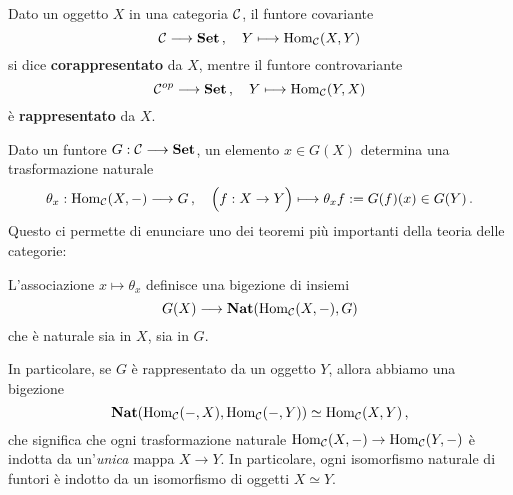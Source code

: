 



\begin{df}
	Dato un oggetto $X$ in una categoria $\mathcal{C}$, il funtore covariante
	\begin{equation*}
		\mathcal{C} \longrightarrow {\normalfont\textbf{Set}}\,, \quad Y \longmapsto \operatorname{Hom}_{\mathcal{C}}(X,Y)
	\end{equation*}
	si dice \textbf{corappresentato} da $X$, mentre il funtore controvariante
	\begin{equation*}
		\mathcal{C}^{op} \longrightarrow {\normalfont\textbf{Set}}\,, \quad Y \longmapsto \operatorname{Hom}_{\mathcal{C}}(Y,X)
	\end{equation*}
	è \textbf{rappresentato} da $X$.
\end{df}



Dato un funtore $G:\mathcal{C} \longrightarrow {\normalfont\textbf{Set}}$,
un elemento $x \in G(X)$ determina una trasformazione naturale
\begin{equation*}
	\theta_{x}: \operatorname{Hom}_{\mathcal{C}}(X,-) \longrightarrow G\,,
	\quad \Big(f:X \to Y \Big) \longmapsto \theta_{x}f := G(f)(x) \in G(Y)\,.
\end{equation*}
Questo ci permette di enunciare uno dei teoremi più importanti
della teoria delle categorie:
\begin{thm}\label{yoneda-lemma}
	L'associazione $x \mapsto \theta_{x}$ definisce una bigezione di insiemi
	\begin{equation*}
		G(X) \longrightarrow {\normalfont\textbf{Nat}}(\operatorname{Hom}_{\mathcal{C}}(X,-),G)
	\end{equation*}
	che è naturale sia in $X$, sia in $G$.
\end{thm}


In particolare, se $G$ è rappresentato da un oggetto $Y$,
allora abbiamo una bigezione
\begin{equation*}
	{\normalfont\textbf{Nat}}(\operatorname{Hom}_{\mathcal{C}}(-,X), \operatorname{Hom}_{\mathcal{C}}(-,Y)) \simeq \operatorname{Hom}_{\mathcal{C}}(X,Y)\,,
\end{equation*}
che significa che ogni trasformazione naturale $\operatorname{Hom}_{\mathcal{C}}(X,-) \to \operatorname{Hom}_{\mathcal{C}}(Y,-)$
è indotta da un'\emph{unica} mappa $X \to Y$.
In particolare, ogni isomorfismo naturale di funtori è indotto
da un isomorfismo di oggetti $X \simeq Y$.


